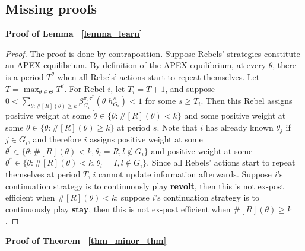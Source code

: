 \documentclass[12pt,letter]{article}
\newtheorem*{theorem*}{Theorem}
\newtheorem*{lemma*}{Lemma}
\theoremstyle{definition}
\theoremstyle{remark}
\theoremstyle{claim}
\begin{document}
\subsection{Missing proofs}
\noindent\textbf{Proof of Lemma ~\ref{lemma_learn}}
\begin{proof}
The proof is done by contraposition. Suppose Rebels' strategies constitute an APEX equilibrium. By definition of the APEX equilibrium, at every $\theta$, there is a period $T^{\theta}$ when all Rebels' actions start to repeat themselves. Let $T=\max_{\theta\in \Theta}{T^{\theta}}$. For Rebel $i$, let $T_i=T+1$, and suppose $0<\sum_{\theta:\#[R](\theta)\geq k}\beta^{\pi,\tau^*}_{G_i}(\theta|h^{s}_{G_i})<1$ for some $s\geq T_i$. Then this Rebel assigns positive weight at some $\dot{\theta}\in \{\theta:\#[R](\theta)< k\}$ and some positive weight at some $\ddot{\theta}\in \{\theta:\#[R](\theta)\geq k\}$ at period $s$. Note that $i$ has already known $\theta_j$ if $j\in G_i$, and therefore $i$ assigns positive weight at some $\theta^{'}\in \{\theta:\#[R](\theta)< k, \theta_l=R, l\notin G_i\}$ and positive weight at some $\theta^{''}\in \{\theta:\#[R](\theta)< k, \theta_l=I, l\notin G_i\}$. Since all Rebels' actions start to repeat themselves at period $T$, $i$ cannot update information afterwards. Suppose $i$'s continuation strategy is to continuously play \textbf{revolt}, then this is not ex-post efficient when $\#[R](\theta)< k$; suppose $i$'s continuation strategy is to continuously play \textbf{stay}, then this is not ex-post efficient when $\#[R](\theta)\geq k$.
\end{proof}
%
%
\bigskip
\noindent\textbf{Proof of Theorem ~\ref{thm_minor_thm}}
\end{document}
